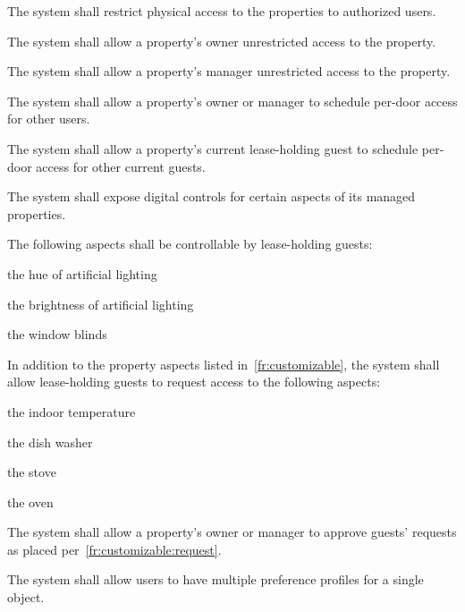 \documentclass[letter,titlepage,oneside,english]{report}
\begin{document}
\begin{fr}
\item
  The system shall restrict physical access to the properties to authorized users.
  \begin{fr}
  \item
    The system shall allow a property's owner unrestricted access to the property.
  \item
    The system shall allow a property's manager unrestricted access to the property.
  \item
    The system shall allow a property's owner or manager to schedule per-door access for other users.
  \item
    The system shall allow a property's current lease-holding guest to schedule per-door access for other current guests.
  \end{fr}
\item\label{fr:controls}
  The system shall expose digital controls for certain aspects of its managed properties.
  \begin{fr}
  \item\label{fr:customizable}
    The following aspects shall be controllable by lease-holding guests:
    \begin{fr}
    \item
      the hue of artificial lighting
    \item
      the brightness of artificial lighting
    \item
      the window blinds
    \end{fr}
  \item\label{fr:customizable:request}
    In addition to the property aspects listed in~\ref{fr:customizable}, the system shall allow lease-holding guests to request access to the following aspects:
    \begin{fr}
    \item
      the indoor temperature
    \item
      the dish washer
    \item
      the stove
    \item
      the oven
    \end{fr}
  \item\label{fr:customizable:request_approve}
    The system shall allow a property's owner or manager to approve guests' requests as placed per~\ref{fr:customizable:request}.
  \item\label{fr:customizable:multiple_profiles}
    The system shall allow users to have multiple preference profiles for a single object.
  \item

\end{fr}
\end{fr}
\end{document}

